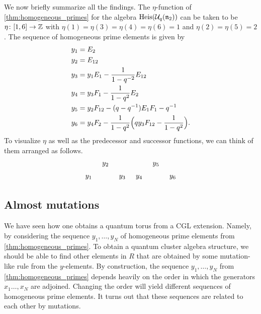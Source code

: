 \begin{example}
	We now briefly summarize all the findings. The $\eta$-function of
	\cref{thm:homogeneous_primes} for the algebra $\operatorname{Heis}(\mathcal{U}_q(\mathfrak{n}_2))$ can be taken to be $\eta
		\colon [1, 6] \to \mathbb{Z}$ with $\eta(1)=\eta(3)=\eta(4)=\eta(6) = 1$ and $\eta(2) =
		\eta(5) = 2$. The sequence of homogeneous prime elements is given by
	\begin{equation}\label{eq:heisenberg_hom_primes}
		\begin{aligned}
			y_1 & = E_2                                                                      \\
			y_2 & = E_{12}                                                                   \\
			y_3 & = y_1 E_1 - \frac{1}{1- q^{-2}}E_{12}                                      \\
			y_4 & = y_3 F_1 - \frac{1}{1-q^2} E_2                                            \\
			y_5 & = y_2 F_{12} - (q - q^{-1}) E_1 F_1 - q ^{-1}                                \\
			y_6 & = y_4 F_2 - \frac{1}{1-q^2} \Bigl(q y_3 F_{12} - \frac{1}{1 - q^2} \Bigr).
		\end{aligned}
	\end{equation}
	To visualize $\eta$ as well as the predecessor and successor functions, we can think of
	them arranged as follows.
	\begin{equation*}
		\begin{tikzcd}[sep=tiny]
			& y_2 & & & y_5 \\
			y_1 & & y_3 & y_4 & & y_6
		\end{tikzcd}
	\end{equation*}

\end{example}

\subsection{Almost mutations}

We have seen how one obtains a quantum torus from a CGL extension. Namely, by
considering the sequence $y_1, \dots, y_N$ of homogeneous prime elements from
\cref{thm:homogeneous_primes}. To obtain a quantum cluster algebra structure, we should
be able to find other elements in $R$ that are obtained by some mutation-like rule from
the $y$-elements. By construction, the sequence $y_1, \dots, y_N$ from
\cref{thm:homogeneous_primes} depends heavily on the order in which the generators $x_1
	\dots, x_N$ are adjoined. Changing the order will yield different sequences of
homogeneous prime elements. It turns out that these sequences are related to each other
by mutations.

